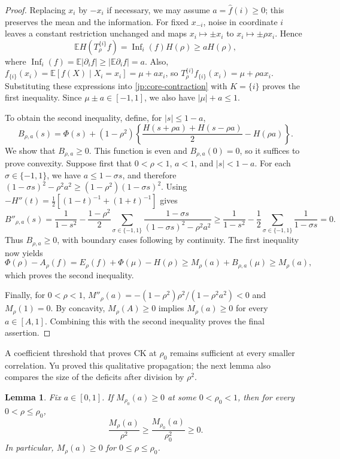 \documentclass[11pt,letterpaper]{amsart}
\newcommand{\E}{\mathbb E}
\newcommand{\1}{\mathbf 1}
\newtheorem{lemma}[theorem]{Lemma}
\numberwithin{equation}{section}
\begin{document}
\begin{proof}
Replacing $x_i$ by $-x_i$ if necessary, we may assume
$a=\widehat f(i)\ge0$; this preserves the mean and the information.
For fixed $x_{-i}$, noise in coordinate $i$ leaves a constant
restriction unchanged and maps $x_i\mapsto\pm x_i$ to
$x_i\mapsto\pm\rho x_i$. Hence
\[
 \E H(T_\rho^{\{i\}}f)
 =\operatorname{Inf}_i(f)H(\rho)\ge aH(\rho),
\]
where
$\operatorname{Inf}_i(f)=\E|\partial_i f|
\ge|\E\partial_i f|=a$.
Also,
$f_{\{i\}}(x_i)=\E[f(X)\mid X_i=x_i]=\mu+ax_i$,
so $T_\rho^{\{i\}}f_{\{i\}}(x_i)=\mu+\rho ax_i$.
Substituting these expressions into
\eqref{jp:core-contraction} with $K=\{i\}$ proves the first
inequality. Since $\mu\pm a\in[-1,1]$, we also have
$|\mu|+a\le1$.

To obtain the second inequality, define, for $|s|\le1-a$,
\[
 B_{\rho,a}(s)=\Phi(s)+(1-\rho^2)
 \left\{\frac{H(s+\rho a)+H(s-\rho a)}2-H(\rho a)\right\}.
\]
We show that $B_{\rho,a}\ge0$. This function is even and
$B_{\rho,a}(0)=0$, so it suffices to prove convexity.
Suppose first that $0<\rho<1$, $a<1$, and $|s|<1-a$.
For each $\sigma\in\{-1,1\}$, we have $a\le1-\sigma s$,
and therefore
$(1-\sigma s)^2-\rho^2a^2
\ge(1-\rho^2)(1-\sigma s)^2$.
Using $-H''(t)=\tfrac12[(1-t)^{-1}+(1+t)^{-1}]$ gives
\[
B''_{\rho,a}(s)
 =\frac1{1-s^2}
   -\frac{1-\rho^2}{2}
    \sum_{\sigma\in\{-1,1\}}
    \frac{1-\sigma s}{(1-\sigma s)^2-\rho^2a^2}\ge\frac1{1-s^2}
   -\frac12\sum_{\sigma\in\{-1,1\}}\frac1{1-\sigma s}
 =0.
\]
Thus $B_{\rho,a}\ge0$, with boundary cases following
by continuity. The first inequality now yields
\[
\Phi(\rho)-A_\rho(f)
 =E_\rho(f)+\Phi(\mu)-H(\rho)\ge M_\rho(a)+B_{\rho,a}(\mu)
 \ge M_\rho(a),
\]
which proves the second inequality.

Finally, for $0<\rho<1$,
$M''_\rho(a)=-(1-\rho^2)\rho^2/(1-\rho^2a^2)<0$
and $M_\rho(1)=0$.
By concavity, $M_\rho(A)\ge0$ implies
$M_\rho(a)\ge0$ for every $a\in[A,1]$.
Combining this with the second inequality proves the final assertion.
\end{proof}

A coefficient threshold that proves CK at $\rho_0$ remains sufficient
at every smaller correlation. Yu \cite[Lemma~4.9]{Yu2026Local} proved
this qualitative propagation; the next lemma also compares the size
of the deficits after division by $\rho^2$.

\begin{lemma}\label{ub:local-propagation}
Fix $a\in[0,1]$. If $M_{\rho_0}(a)\ge0$ at some
$0<\rho_0<1$, then for every $0<\rho\le\rho_0$,
\[
 \frac{M_\rho(a)}{\rho^2}\ge
 \frac{M_{\rho_0}(a)}{\rho_0^2}\ge0.
\]
In particular, $M_\rho(a)\ge0$ for $0\le\rho\le\rho_0$.
\end{lemma}
\end{document}
